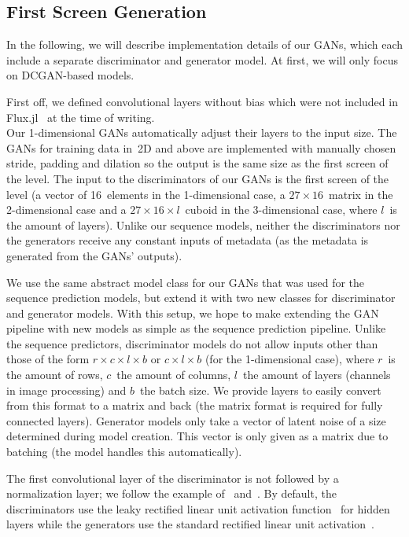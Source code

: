 \subsection{First Screen Generation}
\label{sec:first-screen-generation}

In the following, we will describe implementation details of our GANs,
which each include a separate discriminator and generator model.
At first, we will only focus on DCGAN-based models.

First off, we defined convolutional layers without bias which were not
included in \mbox{Flux.jl}~\cite{FluxMLFluxJl2019} at the time of
writing. \\
Our 1-dimensional GANs automatically adjust their layers to the input
size. The GANs for training data in~2D and above are implemented with
manually chosen stride, padding and dilation so the output is the same
size as the first screen of the level. The input to the discriminators
of our GANs is the first screen of the level (a vector of 16~elements
in the 1-dimensional case, a $27 \times 16$~matrix in the 2-dimensional
case and a $27 \times 16 \times l$~cuboid in the 3-dimensional case, where
$l$~is the amount of layers). Unlike our sequence models, neither the
discriminators nor the generators receive any constant inputs of
metadata (as the metadata is generated from the GANs' outputs).

We use the same abstract model class for our GANs that was used for
the sequence prediction models, but extend it with two new classes for
discriminator and generator models. With this setup, we hope to make
extending the GAN pipeline with new models as simple as the sequence
prediction pipeline. Unlike the sequence predictors, discriminator
models do not allow inputs other than those of the form
$r \times c \times l \times b$ or $c \times l \times b$ (for the
1-dimensional case), where $r$~is the amount of rows, $c$~the amount
of columns, $l$~the amount of layers (channels in image processing)
and $b$~the batch size. We provide layers to easily convert from this
format to a matrix and back (the matrix format is required for fully
connected layers). Generator models only take a vector of latent noise
of a size determined during model creation. This vector is only given
as a matrix due to batching (the model handles this automatically).

The first convolutional layer of the discriminator is not followed by
a normalization layer; we follow the example
of~\cite{PytorchExamples2019}
and~\cite{martinarjovskyMartinarjovskyWassersteinGAN2019}. By default,
the discriminators use the leaky rectified linear unit activation
function~\cite{maasRectifierNonlinearitiesImprove,RectifierNeuralNetworks2019}
for hidden layers while the generators use the standard rectified
linear unit
activation~\cite{nairRectifiedLinearUnits,RectifierNeuralNetworks2019}.

